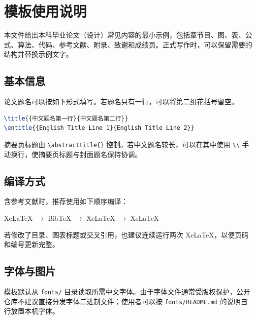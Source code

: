\documentclass[AutoFakeBold]{LZUThesis_xb}
\begin{document}
\customcontent

\mainmatter

\chapter{模板使用说明}

本文件给出本科毕业论文（设计）常见内容的最小示例，包括章节目、图、表、公式、算法、代码、参考文献、附录、致谢和成绩页。正式写作时，可以保留需要的结构并替换示例文字。

\section{基本信息}

论文题名可以按如下形式填写。若题名只有一行，可以将第二组花括号留空。

\begin{lstlisting}[language=TeX]
\title{{中文题名第一行}{中文题名第二行}}
\entitle{{English Title Line 1}{English Title Line 2}}
\end{lstlisting}

摘要页标题由 \verb|\abstracttitle{}| 控制。若中文题名较长，可以在其中使用 \verb|\\| 手动换行，使摘要页标题与封面题名保持协调。

\section{编译方式}

含参考文献时，推荐使用如下顺序编译：

\begin{center}
XeLaTeX $\rightarrow$ BibTeX $\rightarrow$ XeLaTeX $\rightarrow$ XeLaTeX
\end{center}

若修改了目录、图表标题或交叉引用，也建议连续运行两次 XeLaTeX，以便页码和编号更新完整。

\section{字体与图片}

模板默认从 \verb|fonts/| 目录读取所需中文字体。由于字体文件通常受版权保护，公开仓库不建议直接分发字体二进制文件；使用者可以按 \verb|fonts/README.md| 的说明自行放置本机字体。
\end{document}
